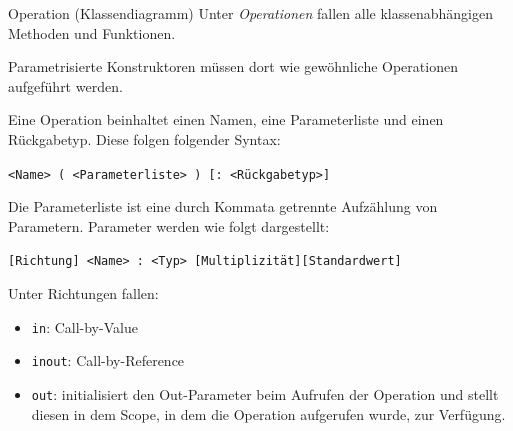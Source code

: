 \begin{diag}{Operation (Klassendiagramm)}
    Unter \emph{Operationen} fallen alle klassenabhängigen Methoden und Funktionen.

    Parametrisierte Konstruktoren müssen dort wie gewöhnliche Operationen aufgeführt werden.

    Eine Operation beinhaltet einen Namen, eine Parameterliste und einen Rückgabetyp.
    Diese folgen folgender Syntax:

    \begin{center}
        \texttt{<Name> ( <Parameterliste> ) [: <Rückgabetyp>]}
    \end{center}

    Die Parameterliste ist eine durch Kommata getrennte Aufzählung von Parametern.
    Parameter werden wie folgt dargestellt:

    \begin{center}
        \texttt{[Richtung] <Name> : <Typ> [Multiplizität][Standardwert]}
    \end{center}

    Unter Richtungen fallen:
    \begin{itemize}
        \item \texttt{in}: Call-by-Value
        \item \texttt{inout}: Call-by-Reference
        \item \texttt{out}: initialisiert den Out-Parameter beim Aufrufen der Operation und stellt diesen in dem Scope, in dem die Operation aufgerufen wurde, zur Verfügung.
    \end{itemize}
\end{diag}

